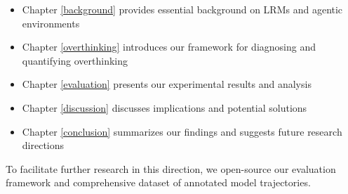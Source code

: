 \begin{itemize}
    \item Chapter \ref{background} provides essential background on LRMs and agentic environments
    \item Chapter \ref{overthinking} introduces our framework for diagnosing and quantifying overthinking
    \item Chapter \ref{evaluation} presents our experimental results and analysis
    \item Chapter \ref{discussion} discusses implications and potential solutions
    \item Chapter \ref{conclusion} summarizes our findings and suggests future research directions
\end{itemize}

To facilitate further research in this direction, we open-source our evaluation framework and comprehensive dataset of annotated model trajectories.
